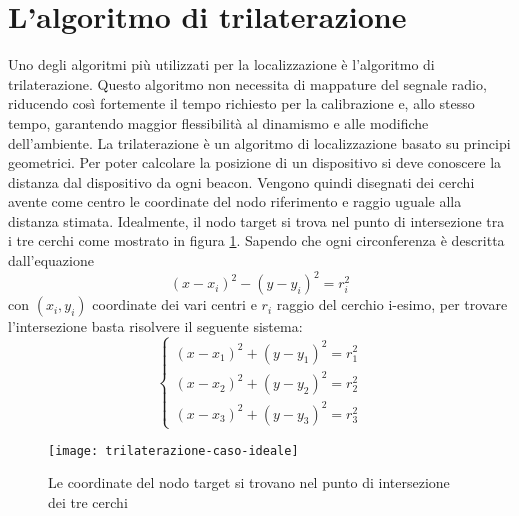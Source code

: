 \section{L'algoritmo di trilaterazione}
\label{par:trilaterazione}
Uno degli algoritmi più utilizzati per la localizzazione è l'algoritmo di trilaterazione. Questo algoritmo non necessita di mappature del segnale radio, riducendo così fortemente il tempo richiesto per la calibrazione e, allo stesso tempo, garantendo maggior flessibilità al dinamismo e alle modifiche dell'ambiente.
La trilaterazione è un algoritmo di localizzazione basato su principi geometrici. Per poter calcolare la posizione di un dispositivo si deve conoscere la distanza dal dispositivo da ogni beacon. Vengono quindi disegnati dei cerchi avente come centro le coordinate del nodo riferimento e raggio uguale alla distanza stimata. Idealmente, il nodo target si trova nel punto di intersezione tra i tre cerchi come mostrato in figura \ref{fig:trilaterazione-caso-ideale}. Sapendo che ogni circonferenza è descritta dall'equazione
\[
(x - x_i)^2 - (y - y_i)^2 = r_i^2
\]
con $(x_i , y_i)$ coordinate dei vari centri e $r_i$ raggio del cerchio i-esimo, per trovare l'intersezione basta risolvere il seguente sistema:
\begin{equation}
\begin{cases}
\label{eq:sistema-trilaterazione}
(x-x_1)^2 + (y-y_1)^2 = r_1^2 \\
(x-x_2)^2 + (y-y_2)^2 = r_2^2 \\
(x-x_3)^2 + (y-y_3)^2 = r_3^2
\end{cases}
\end{equation}

\begin{figure}[htp]
	\centering
	\texttt{[image: trilaterazione-caso-ideale]}
	\caption{Le coordinate del nodo target si trovano nel punto di intersezione dei tre cerchi}
	\label{fig:trilaterazione-caso-ideale}
\end{figure}

